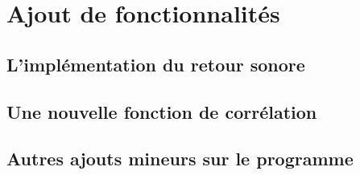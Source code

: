 \section{Ajout de fonctionnalités}

\subsection{L'implémentation du retour sonore}

\subsection{Une nouvelle fonction de corrélation}

\subsection{Autres ajouts mineurs sur le programme}

